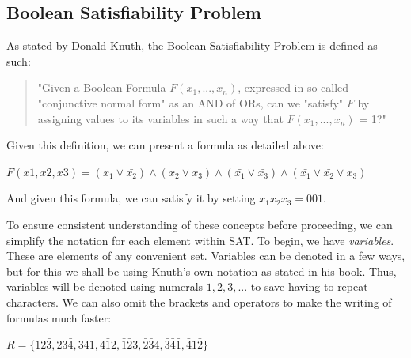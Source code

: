 \documentclass{article}
\begin{document}
\subsection{Boolean Satisfiability Problem}
As stated by Donald Knuth, the Boolean Satisfiability Problem is defined as such:

\begin{quotation}
    "Given a Boolean Formula $F(x_1,...,x_n)$, expressed in so called "conjunctive normal form" as an AND of ORs, can we "satisfy" $F$ by assigning values to its variables in such a way that $F(x_1,...,x_n)$ = 1?"
\end{quotation}

Given this definition, we can present a formula as detailed above:

\begin{center}
    $F(x1,x2,x3) = (x_1 \vee \bar{x_2}) \wedge (x_2 \vee x_3) \wedge (\bar{x_1} \vee \bar{x_3}) \wedge (\bar{x_1} \vee \bar{x_2} \vee x_3)$
\end{center}

And given this formula, we can satisfy it by setting $x_1x_2x_3 = 001$.

To ensure consistent understanding of these concepts before proceeding, we can simplify the notation
for each element within SAT. To begin, we have \textit{variables}. These are elements of any
convenient set. Variables can be denoted in a few ways, but for this we shall be using Knuth's own
notation as stated in his book. Thus, variables will be denoted using numerals $1, 2, 3, ...$ to save
having to repeat characters. We can also omit the brackets and operators to make the writing of
formulas much faster:

\begin{center}
    $R = \{12\bar{3},23\bar{4},341,4\bar{1}2,\bar{1}\bar{2}3,\bar{2}\bar{3}4,\bar{3}\bar{4}\bar{1},\bar{4}1\bar{2}\}$
\end{center}
\end{document}
